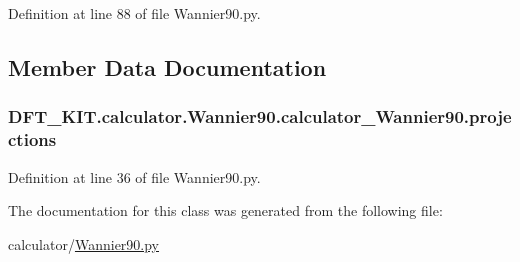 Definition at line 88 of file Wannier90.\+py.



\subsection{Member Data Documentation}
\hypertarget{class_d_f_t___k_i_t_1_1calculator_1_1_wannier90_1_1calculator___wannier90_a673a29eac1991c2660c4ddf30331d453}{
\subsubsection[{projections}]{\setlength{\rightskip}{0pt plus 5cm}D\+F\+T\+\_\+\+K\+I\+T.\+calculator.\+Wannier90.\+calculator\+\_\+\+Wannier90.\+projections}}\label{class_d_f_t___k_i_t_1_1calculator_1_1_wannier90_1_1calculator___wannier90_a673a29eac1991c2660c4ddf30331d453}


Definition at line 36 of file Wannier90.\+py.



The documentation for this class was generated from the following file\+:\begin{DoxyCompactItemize}
\item 
calculator/\hyperlink{_wannier90_8py}{Wannier90.\+py}\end{DoxyCompactItemize}
